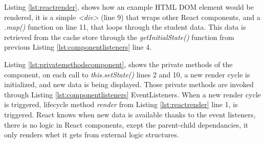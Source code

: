 Listing \ref{lst:reactrender}, shows how an example HTML DOM element would be rendered, it is a simple \emph{<div>} (line 9) that wraps other React components, and a \emph{.map()} function on line 11, that loops through the student data. This data is retrieved from the cache store through the \emph{getInitialState()} function from previous Listing \ref{lst:componentlisteners} line 4.




Listing \ref{lst:privatemethodscomponent}, shows the private methods of the component, on each call to \emph{this.setState()} lines 2 and 10, a new render cycle is initialized, and new data is being displayed. Those private methods are invoked through Listing \ref{lst:componentlisteners} EventListeners.
When a new render cycle is triggered, lifecycle method \emph{render} from Listing \ref{lst:reactrender} line 1, is triggered. React knows when new data is available thanks to the event listeners, there is no logic in React  components, exept the parent-child dependancies, it only renders whet it gets from external logic structures.
